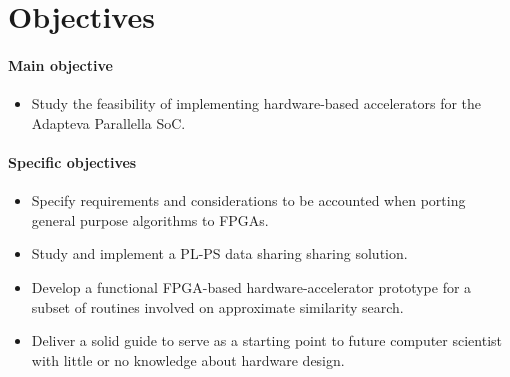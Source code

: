 \documentclass[11pt,letterpaper]{article}
\begin{document}



\section{Objectives}

\paragraph{Main objective}
\begin{itemize}
\item Study the feasibility of implementing hardware-based accelerators for the Adapteva Parallella SoC.
\end{itemize}

\paragraph{Specific objectives}
\begin{itemize}
    \item Specify requirements and considerations to be accounted when porting general purpose algorithms to FPGAs.
    \item Study and implement a PL-PS data sharing sharing solution.
    \item Develop a functional FPGA-based hardware-accelerator prototype for a subset of routines involved on approximate similarity search.
    \item Deliver a solid guide to serve as a starting point to future computer scientist with little or no knowledge about hardware design. 
\end{itemize}
\end{document}
